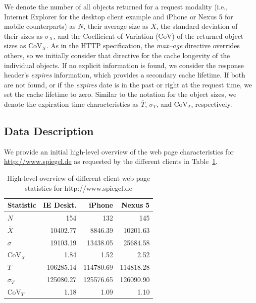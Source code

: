 \documentclass[letterpaper,conference]{IEEEtran}
\begin{document}
We denote the number of all objects returned for a request modality (i.e., Internet Explorer for the desktop client example and iPhone or Nexus 5 for mobile counterparts) as $N$, their average size as $\overline{X}$, the standard deviation of their sizes as ${\sigma}_{X}$, and the Coefficient of Variation (CoV) of the returned object sizes as $\mathrm{CoV}_{X}$. 
As in the HTTP specification, the \emph{max--age} directive overrides others, so we initially consider that directive for the cache longevity of the individual objects. 
If no explicit information is found, we consider the response header's \emph{expires} information, which provides a secondary cache lifetime. 
If both are not found, or if the \emph{expires} date is in the past or right at the request time, we set the cache lifetime to zero. 
Similar to the notation for the object sizes, we denote the expiration time characteristics as $\overline{T}$, $\sigma_{T}$, and $\mathrm{CoV}_{T}$, respectively.


\subsection{Data Description}

We provide an initial high-level overview of the web page characteristics for \url{http://www.spiegel.de} as requested by the different clients in Table~\ref{tab:spiegel}.
\begin{table}
\centering
\caption{High-level overview of different client web page statistics for http://www.spiegel.de}
\label{tab:spiegel}
\begin{tabular}{|l|r|r|r|}
	\hline
	Statistic          & IE Deskt. &    iPhone &   Nexus 5 \\ \hline
	$N$                &       154 &       132 &       145 \\ \hline\hline
	$\overline{X}$     &  10402.77 &   8846.39 &  10201.63 \\ \hline
	$\sigma$           &  19103.19 &  13438.05 &  25684.58 \\ \hline
	$\mathrm{CoV}_{X}$ &      1.84 &      1.52 &      2.52 \\ \hline\hline
	$\overline{T}$     & 106285.14 & 114780.69 & 114818.28 \\ \hline
	$\sigma_{T}$       & 125080.27 & 125576.65 & 126090.90 \\ \hline
	$\mathrm{CoV}_{T}$ &      1.18 &      1.09 &      1.10 \\ \hline
\end{tabular}
\end{table}
\end{document}
